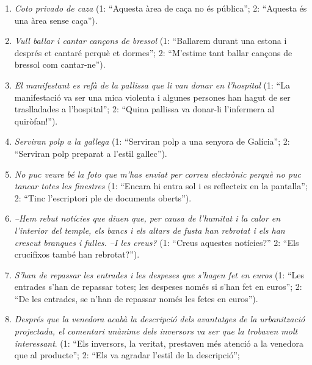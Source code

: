 \begin{enumerate}
\begin{enumerate}
{    policia} (1: ``Els lladres van ser capturats pel comissari a una
    fàbrica abandonada''; 2: ``La fàbrica on van ser capturats va ser
    l'objectiu d'un agent piròman'').
  \item \emph{Coto privado de caza} (1: ``Aquesta àrea de caça no és
    pública''; 2: ``Aquesta és una àrea sense caça'').
  \item \emph{Vull ballar i cantar cançons de bressol} (1: ``Ballarem
    durant una estona i després et cantaré perquè et dormes''; 2:
    ``M'estime tant ballar cançons de bressol com cantar-ne'').
  \item \emph{El manifestant es refà de la pallissa que li van donar en
    l'hospital} (1: ``La manifestació va ser una mica violenta i
    algunes persones han hagut de ser traslladades a l'hospital''; 2:
    ``Quina pallissa va donar-li l'infermera al quiròfan!'').
  \item \emph{Serviran polp a la gallega} (1: ``Serviran polp a una senyora
    de Galícia''; 2: ``Serviran polp preparat a l'estil gallec'').
  \item \emph{No puc veure bé la foto que m'has enviat per correu
      electrònic perquè no puc tancar totes les finestres} (1:
    ``Encara hi entra sol i es reflecteix en la pantalla''; 2: ``Tinc
    l'escriptori ple de documents oberts'').
  \item \emph{--Hem rebut notícies que diuen que, per causa de
      l'humitat i la calor en l'interior del temple, els bancs i els
      altars de fusta han rebrotat i els han crescut branques i
      fulles.  --I les creus?} (1: ``Creus aquestes notícies?'' 2:
    ``Els crucifixos també han rebrotat?'').
  \item \emph{S'han de repassar les entrades i les despeses que
      s'hagen fet en euros} (1: ``Les entrades s'han de repassar
    totes; les despeses només si s'han fet en euros''; 2: ``De les
    entrades, se n'han de repassar només les fetes en euros'').
  \item \emph{Després que la venedora acabà la descripció dels
      avantatges de la urbanització projectada, el comentari unànime
      dels inversors va ser que la trobaven molt interessant}. (1:
    ``Els inversors, la veritat, prestaven més atenció a la venedora
    que al producte''; 2: ``Els va agradar l'estil de la descripció'';

\end{enumerate}
\end{enumerate}
